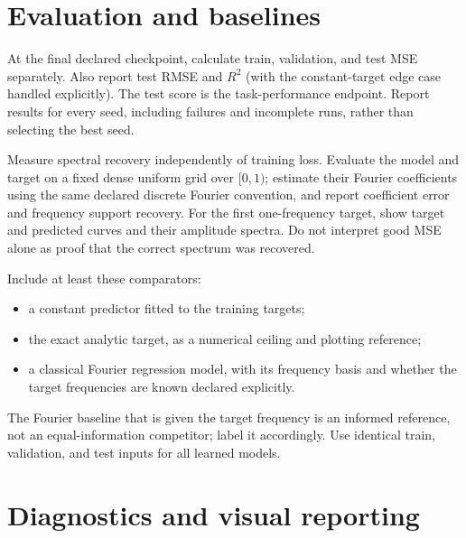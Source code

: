 \documentclass[11pt]{article}
\begin{document}
\section{Evaluation and baselines}

At the final declared checkpoint, calculate train, validation, and test MSE separately. Also report test RMSE and $R^2$ (with the constant-target edge case handled explicitly). The test score is the task-performance endpoint. Report results for every seed, including failures and incomplete runs, rather than selecting the best seed.

Measure spectral recovery independently of training loss. Evaluate the model and target on a fixed dense uniform grid over $[0,1)$; estimate their Fourier coefficients using the same declared discrete Fourier convention, and report coefficient error and frequency support recovery. For the first one-frequency target, show target and predicted curves and their amplitude spectra. Do not interpret good MSE alone as proof that the correct spectrum was recovered.

Include at least these comparators:
\begin{itemize}[leftmargin=*]
  \item a constant predictor fitted to the training targets;
  \item the exact analytic target, as a numerical ceiling and plotting reference;
  \item a classical Fourier regression model, with its frequency basis and whether the target frequencies are known declared explicitly.
\end{itemize}
The Fourier baseline that is given the target frequency is an informed reference, not an equal-information competitor; label it accordingly. Use identical train, validation, and test inputs for all learned models.

\section{Diagnostics and visual reporting}
\end{document}
